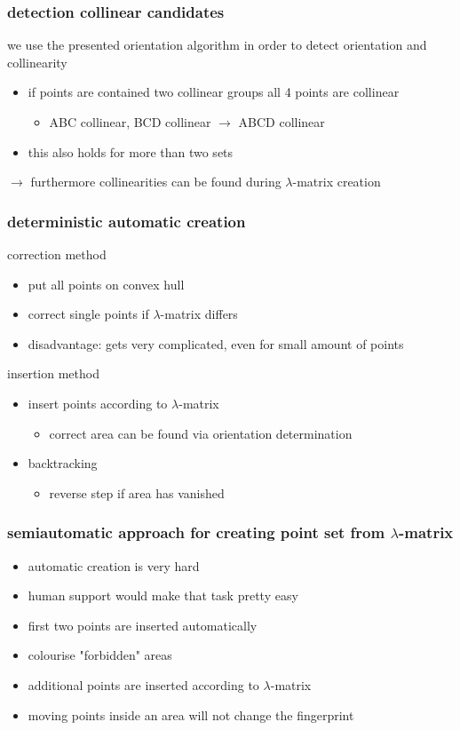 \documentclass{beamer}
\begin{document}
\begin{frame}
\frametitle{detection collinear candidates}
we use the presented orientation algorithm in order to detect orientation and collinearity
\begin{itemize}
\item if points are contained two collinear groups all 4 points are collinear
\begin{itemize}
  \item ABC collinear, BCD collinear $\rightarrow$ ABCD collinear
\end{itemize}
\item this also holds for more than two sets
\end{itemize}
$ \rightarrow $ furthermore collinearities can be found during $\lambda$-matrix creation
\end{frame}
\begin{frame}
\frametitle{deterministic automatic creation}
correction method
\begin{itemize}
  \item put all points on convex hull
  \item correct single points if $\lambda$-matrix differs
  \item disadvantage:  gets very complicated, even for small amount of points
\end{itemize}
insertion method
\begin{itemize}
  \item insert points according to $\lambda$-matrix
      \begin{itemize}
       \item correct area can be found via orientation determination
      \end{itemize} 
  \item backtracking
      \begin{itemize}
       \item reverse step if area has vanished
      \end{itemize} 
  
\end{itemize}
\end{frame}
\begin{frame}
\frametitle{semiautomatic approach for creating point set from $\lambda$-matrix}
\begin{itemize}
  \item automatic creation is very hard
  \item human support would make that task pretty easy
  \item first two points are inserted automatically
  \item colourise "forbidden" areas
  \item additional points are inserted according to $\lambda$-matrix
  \item moving points inside an area will not change the fingerprint
\end{itemize}
\end{frame}
\end{document}
